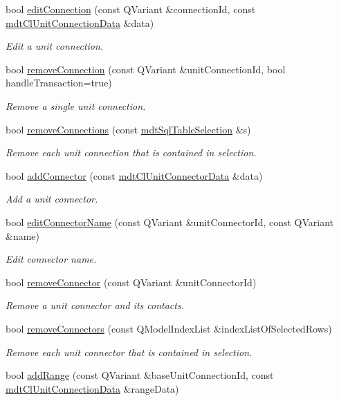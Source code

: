 \begin{DoxyCompactItemize}
bool \hyperlink{classmdt_cl_unit_aac3afb2a4895a16f637b765b44cbca9e}{edit\-Connection} (const Q\-Variant \&connection\-Id, const \hyperlink{classmdt_cl_unit_connection_data}{mdt\-Cl\-Unit\-Connection\-Data} \&data)
\begin{DoxyCompactList}\small\item\em Edit a unit connection. \end{DoxyCompactList}\item 
bool \hyperlink{classmdt_cl_unit_aa4b4f148293abc335704515251ed4f5b}{remove\-Connection} (const Q\-Variant \&unit\-Connection\-Id, bool handle\-Transaction=true)
\begin{DoxyCompactList}\small\item\em Remove a single unit connection. \end{DoxyCompactList}\item 
bool \hyperlink{classmdt_cl_unit_a003f76bd0eaac138d3d2c3e9bf25ef08}{remove\-Connections} (const \hyperlink{classmdt_sql_table_selection}{mdt\-Sql\-Table\-Selection} \&s)
\begin{DoxyCompactList}\small\item\em Remove each unit connection that is contained in selection. \end{DoxyCompactList}\item 
bool \hyperlink{classmdt_cl_unit_acafdba8ebc2f5044b096282ecc41da41}{add\-Connector} (const \hyperlink{classmdt_cl_unit_connector_data}{mdt\-Cl\-Unit\-Connector\-Data} \&data)
\begin{DoxyCompactList}\small\item\em Add a unit connector. \end{DoxyCompactList}\item 
bool \hyperlink{classmdt_cl_unit_a7bb1ff9cc5469f45dbf244fd26d60329}{edit\-Connector\-Name} (const Q\-Variant \&unit\-Connector\-Id, const Q\-Variant \&name)
\begin{DoxyCompactList}\small\item\em Edit connector name. \end{DoxyCompactList}\item 
bool \hyperlink{classmdt_cl_unit_a86244b8f9b2ff41c05b32749c038813d}{remove\-Connector} (const Q\-Variant \&unit\-Connector\-Id)
\begin{DoxyCompactList}\small\item\em Remove a unit connector and its contacts. \end{DoxyCompactList}\item 
bool \hyperlink{classmdt_cl_unit_a5865c061516caf7d04b7569eba47c3af}{remove\-Connectors} (const Q\-Model\-Index\-List \&index\-List\-Of\-Selected\-Rows)
\begin{DoxyCompactList}\small\item\em Remove each unit connector that is contained in selection. \end{DoxyCompactList}\item 
bool \hyperlink{classmdt_cl_unit_a35a35f22daf4a408f5400031c12ce3cf}{add\-Range} (const Q\-Variant \&base\-Unit\-Connection\-Id, const \hyperlink{classmdt_cl_unit_connection_data}{mdt\-Cl\-Unit\-Connection\-Data} \&range\-Data)
\end{DoxyCompactItemize}
